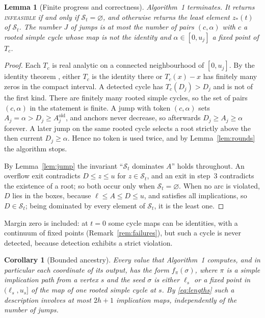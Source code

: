 \documentclass[11pt,a4paper]{article}
\theoremstyle{plain}
\newtheorem{lemma}[theorem]{Lemma}
\newtheorem{corollary}[theorem]{Corollary}
\theoremstyle{definition}
\theoremstyle{remark}
\newcommand{\St}{\mathcal{S}_t}
\newcommand{\INF}{\textnormal{\textsc{infeasible}}}
\begin{document}
\begin{lemma}[Finite progress and correctness]\label{lem:termination}
Algorithm~1 terminates. It returns \INF{} if and only if $\St=\varnothing$, and otherwise returns the least element $z_*(t)$ of $\St$. The number $J$ of jumps is at most the number of pairs $(c,\alpha)$ with $c$ a rooted simple cycle whose map is not the identity and $\alpha\in[0,u_j]$ a fixed point of $T_c$.
\end{lemma}
\begin{proof}
Each $T_c$ is real analytic on a connected neighbourhood of $[0,u_j]$. By the identity theorem \citep{krantz2002}, either $T_c$ is the identity there or $T_c(x)-x$ has finitely many zeros in the compact interval. A detected cycle has $T_c(D_j)>D_j$ and is not of the first kind. There are finitely many rooted simple cycles, so the set of pairs $(c,\alpha)$ in the statement is finite. A jump with token $(c,\alpha)$ sets $A_j=\alpha>D_j\ge A_j^{\mathrm{old}}$, and anchors never decrease, so afterwards $D_j\ge A_j\ge\alpha$ forever. A later jump on the same rooted cycle selects a root strictly above the then current $D_j\ge\alpha$. Hence no token is used twice, and by Lemma~\ref{lem:rounds} the algorithm stops.

By Lemma~\ref{lem:jump} the invariant ``$\St$ dominates $A$'' holds throughout. An overflow exit contradicts $D\le z\le u$ for $z\in\St$, and an exit in step~3 contradicts the existence of a root; so both occur only when $\St=\varnothing$. When no arc is violated, $D$ lies in the boxes, because $\ell\le A\le D\le u$, and satisfies all implications, so $D\in\St$; being dominated by every element of $\St$, it is the least one.
\end{proof}

Margin zero is included: at $t=0$ some cycle maps can be identities, with a continuum of fixed points (Remark~\ref{rem:failures}), but such a cycle is never detected, because detection exhibits a strict violation.

\begin{corollary}[Bounded ancestry]\label{cor:ancestry}
Every value that Algorithm~1 computes, and in particular each coordinate of its output, has the form $f_\pi(\sigma)$, where $\pi$ is a simple implication path from a vertex $s$ and the \emph{seed} $\sigma$ is either $\ell_s$ or a fixed point in $(\ell_s,u_s]$ of the map of one rooted simple cycle at $s$. By \eqref{eq:lengths} such a description involves at most $2h+1$ implication maps, independently of the number of jumps.
\end{corollary}
\end{document}
